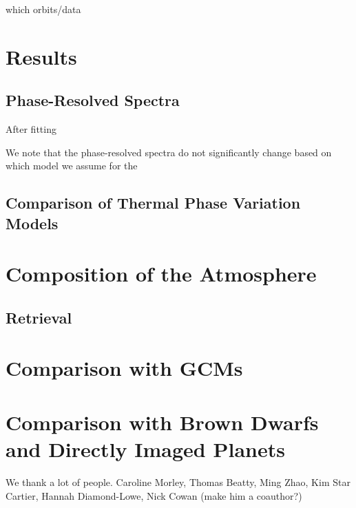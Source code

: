 \documentclass[twocolumn]{aastex61}
\begin{document}
which orbits/data


\section{Results}

\subsection{Phase-Resolved Spectra}
After fitting

We note that the phase-resolved spectra do not significantly change based on which model we assume for the  

\subsection{Comparison of Thermal Phase Variation Models}




\section{Composition of the Atmosphere}

\subsection{Retrieval}

\section{Comparison with GCMs}

\section{Comparison with Brown Dwarfs and Directly Imaged Planets}


\acknowledgments
We thank a lot of people. Caroline Morley, Thomas Beatty, Ming Zhao, Kim Star Cartier, Hannah Diamond-Lowe, Nick Cowan (make him a coauthor?)



\end{document}
